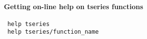  \paragraph{Getting on-line help on tseries functions}
 
 \begin{verbatim}
 help tseries
 help tseries/function_name
 \end{verbatim}




